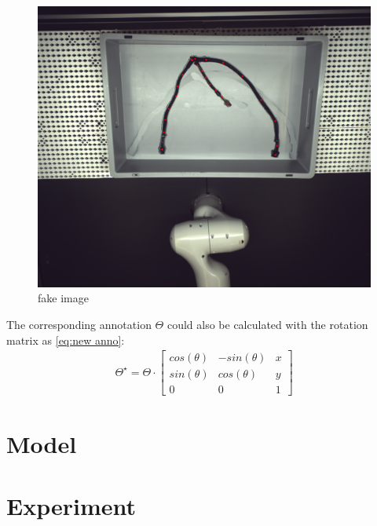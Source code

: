 	\begin{figure}[!htbp]
		\centering
		\includegraphics[width=0.6\linewidth]{example_images/img_0_segment_fakeImages}
		\caption{fake image}
		\label{fig:fake image}
	\end{figure}
	The corresponding annotation $\Theta $ could also be calculated with the rotation matrix as \autoref{eq:new anno}:
	\begin{align}
		\Theta ^{\star } = \Theta \cdot \begin{bmatrix}
			cos(\theta)&  -sin(\theta )&x \\
			sin(\theta )&  cos(\theta )&y  \\
			0&  0&1
		\end{bmatrix} \label{eq:new anno}
	\end{align}
\section{Model}
\section{Experiment}